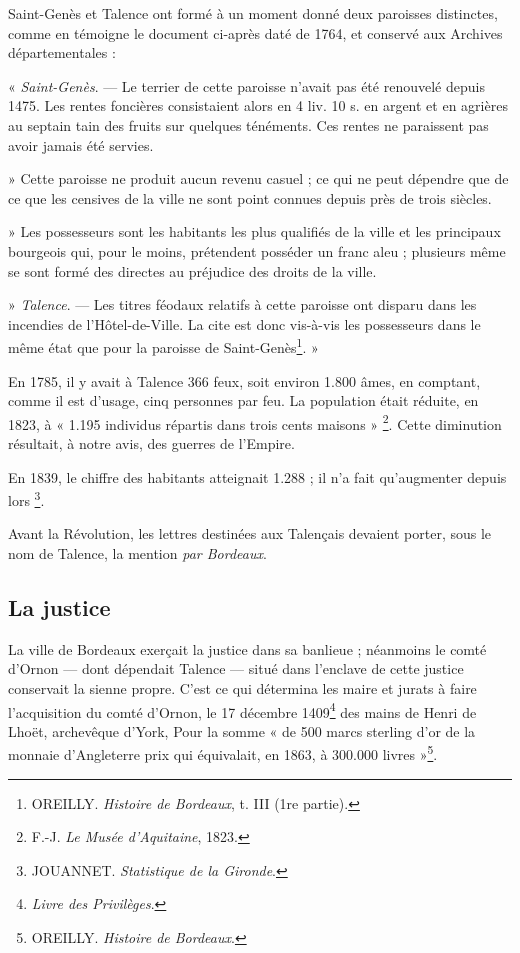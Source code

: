 Saint-Genès et Talence ont formé à un moment donné deux paroisses distinctes, comme en témoigne le document ci-après daté de 1764, et conservé aux Archives départementales : 

« \textit{Saint-Genès}. — Le terrier de cette paroisse n'avait pas été renouvelé depuis 1475. Les rentes foncières consistaient alors en 4 liv. 10 s. en argent et en agrières au septain tain des fruits sur quelques ténéments. Ces rentes ne paraissent pas avoir jamais été servies. 

» Cette paroisse ne produit aucun revenu casuel ; ce qui ne peut dépendre que de ce que les censives de la ville ne sont point connues depuis près de trois siècles.

» Les possesseurs sont les habitants les plus qualifiés de la ville et les principaux bourgeois qui, pour le moins, prétendent posséder un franc aleu ; plusieurs même se sont formé des directes au préjudice des droits de la ville.

» \textit{Talence}. — Les titres féodaux relatifs à cette paroisse ont disparu dans les incendies de l'Hôtel-de-Ville. La cite est donc vis-à-vis les possesseurs dans le même état que pour la paroisse de Saint-Genès\footnote{OREILLY. \textit{Histoire de Bordeaux}, t. III (1re partie).}. »

En 1785, il y avait à Talence 366 feux, soit environ 1.800 âmes, en comptant, comme il est d'usage, cinq personnes par feu. La population était réduite, en 1823, à « 1.195 individus répartis dans trois cents maisons » \footnote{F.-J. \textit{Le Musée d'Aquitaine}, 1823.}. Cette diminution résultait, à notre avis, des guerres de l'Empire. 

En 1839, le chiffre des habitants atteignait 1.288 ; il n'a fait qu'augmenter depuis lors \footnote{JOUANNET. \textit{Statistique de la Gironde}.}. 

Avant la Révolution, les lettres destinées aux Talençais devaient porter, sous le nom de Talence, la mention \textit{par Bordeaux}. 


\subsection{La justice}

La ville de Bordeaux exerçait la justice dans sa banlieue ; néanmoins le comté d'Ornon — dont dépendait Talence — situé dans l'enclave de cette justice conservait la sienne propre. C'est ce qui détermina les maire et jurats à faire l'acquisition du comté d'Ornon, le 17 décembre 1409\footnote{\textit{Livre des Privilèges}.} des mains de Henri de Lhoët, archevêque d'York, Pour la somme « de 500 marcs sterling d'or de la monnaie d'Angleterre prix qui équivalait, en 1863, à 300.000 livres »\footnote{OREILLY. \textit{Histoire de Bordeaux}.}.

